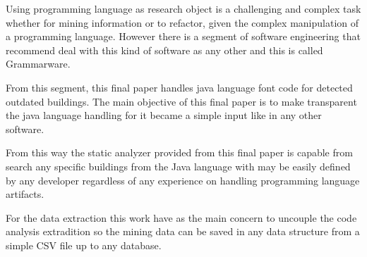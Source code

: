 Using programming language as research object is a challenging and complex task whether for mining information or to refactor, given the complex manipulation of a programming language. However there is a segment of software engineering that recommend deal with this kind of software as any other and this is called Grammarware.

From this segment, this final paper handles java language font code for detected outdated buildings. The main objective of this final paper is to make transparent the java language handling for it became a simple input like in any other software.

From this way the static analyzer provided from this final paper is capable from search any specific buildings from the Java language with may be easily defined by any developer regardless of any experience on handling programming language artifacts.

For the data extraction this work have as the main concern to uncouple the code analysis extradition so the mining data can be saved in any data structure from a simple CSV file up to any database.



